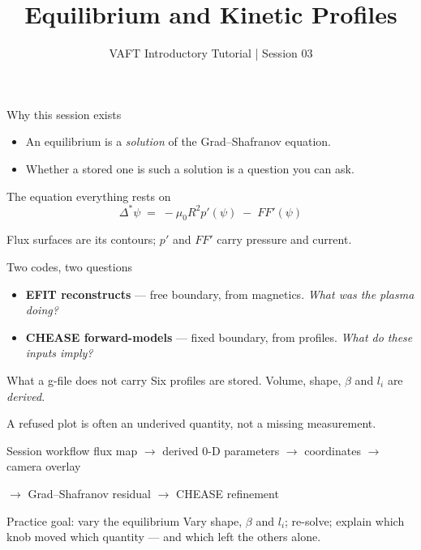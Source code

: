 \documentclass[aspectratio=169]{beamer}
\title{Equilibrium and Kinetic Profiles}
\subtitle{VAFT Introductory Tutorial | Session 03}
\author{}
\date{}
\begin{document}
\begin{frame}
  \titlepage
\end{frame}

\begin{frame}{Why this session exists}
  \begin{itemize}
    \item An equilibrium is a \emph{solution} of the Grad--Shafranov equation.
    \item Whether a stored one is such a solution is a question you can ask.
  \end{itemize}
\end{frame}

\begin{frame}{The equation everything rests on}
  \centering
  \[
    \Delta^{*}\psi \;=\; -\mu_{0}R^{2}p'(\psi) \;-\; FF'(\psi)
  \]
  \vspace{1em}

  Flux surfaces are its contours; \(p'\) and \(FF'\) carry pressure and current.
\end{frame}

\begin{frame}{Two codes, two questions}
  \begin{itemize}
    \item \textbf{EFIT reconstructs} --- free boundary, from magnetics.
      \emph{What was the plasma doing?}
    \item \textbf{CHEASE forward-models} --- fixed boundary, from profiles.
      \emph{What do these inputs imply?}
  \end{itemize}
\end{frame}

\begin{frame}{What a g-file does not carry}
  Six profiles are stored. Volume, shape, \(\beta\) and \(l_i\) are
  \emph{derived}.

  \vspace{1em}
  A refused plot is often an underived quantity, not a missing measurement.
\end{frame}

\begin{frame}{Session workflow}
  \centering
  flux map \(\rightarrow\) derived 0-D parameters \(\rightarrow\) coordinates
  \(\rightarrow\) camera overlay

  \vspace{0.5em}
  \(\rightarrow\) Grad--Shafranov residual \(\rightarrow\) CHEASE refinement
\end{frame}

\begin{frame}{Practice goal: vary the equilibrium}
  Vary shape, \(\beta\) and \(l_i\); re-solve; explain which knob moved which
  quantity --- and which left the others alone.
\end{frame}
\end{document}

